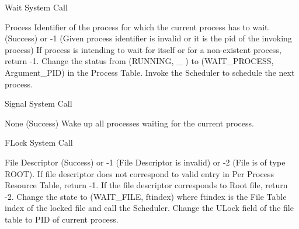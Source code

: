 
\begin{algorithm}
\caption{Wait System Call}
\begin{algorithmic}
\REQUIRE Process Identifier of the process for which the current process has to wait.
 (Success) or -1 (Given process identifier is invalid or it is the pid of the invoking process)
\STATE If process is intending to wait for itself or for a non-existent process, return -1.    
\STATE Change the status from (RUNNING, \_ ) to (WAIT\_PROCESS, Argument\_PID) in the Process Table.
\STATE Invoke the Scheduler to schedule the next process.
\end{algorithmic}
\end{algorithm}


\begin{algorithm}
\caption{Signal System Call}
\begin{algorithmic}
\REQUIRE None
 (Success) 
\STATE Wake up all processes waiting for the current process.
\end{algorithmic}
\end{algorithm}


\begin{algorithm}
\caption{FLock System Call}
\begin{algorithmic}
\REQUIRE File Descriptor
 (Success) or -1 (File Descriptor is invalid) or -2 (File is of type ROOT). 
\STATE If file descriptor does not correspond to valid entry in Per Process Resource Table, return -1.
\STATE If the file descriptor corresponds to Root file, return -2.
    \STATE Change the state to (WAIT\_FILE, ftindex) where ftindex is the File Table index of the locked file and call the Scheduler.
\ENDWHILE
\STATE Change the ULock field of the file table to PID of current process.     
\end{algorithmic}
\end{algorithm}

